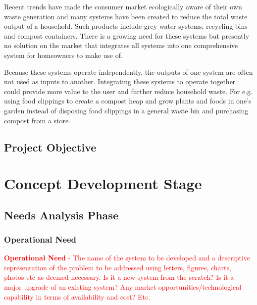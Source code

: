 \documentclass[a4paper,11pt,fleqn]{report}
\begin{document}
Recent trends have made the consumer market ecologically aware of their own waste generation and many systems have been created to reduce the total waste output of a household. Such products include grey water systems, recycling bins and compost containers. There is a growing need for these systems but presently no solution on the market that integrates all systems into one comprehensive system for homeowners to make use of.
  
Because these systems operate independently, the outputs of one system are often not used as inputs to another. Integrating these systems to operate together could provide more value to the user and further reduce household waste. For e.g. using food clippings to create a compost heap and grow plants and foods in one's garden instead of disposing food clippings in a general waste bin and purchasing compost from a store.

\section{Project Objective} \label{sec: Project Objective}

\chapter{Concept Development Stage}
\section{Needs Analysis Phase} \label{sec: Needs Analysis Phase}
\subsection{Operational Need} \label{Ssec: Operational Need}
\textcolor{red}{\textbf{Operational Need} - The name of the system to be developed and a descriptive representation of the problem to be addressed using letters, figures, charts, photos etc as deemed necessary. Is it a new system from the scratch? Is it a major upgrade of an existing system? Any market opportunities/technological capability in terms of availability and cost? Etc.}
\end{document}
